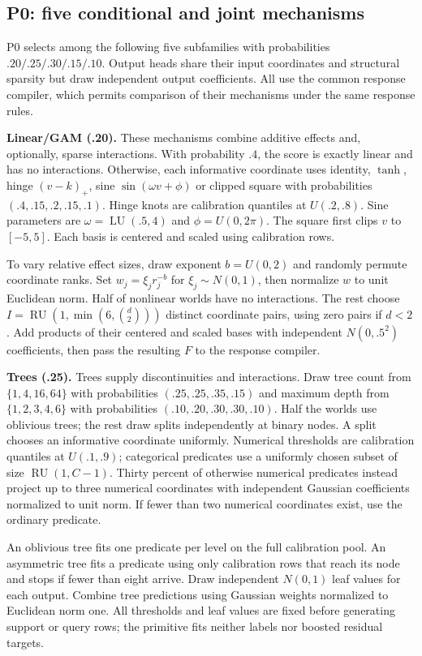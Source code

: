 \documentclass[11pt]{article}
\begin{document}
\subsection{P0: five conditional and joint mechanisms}

P0 selects among the following five subfamilies with probabilities $.20/.25/.30/.15/.10$. Output heads share their input coordinates and structural sparsity but draw independent output coefficients. All use the common response compiler, which permits comparison of their mechanisms under the same response rules.

\textbf{Linear/GAM (.20).} These mechanisms combine additive effects and, optionally, sparse interactions. With probability $.4$, the score is exactly linear and has no interactions. Otherwise, each informative coordinate uses identity, $\tanh$, hinge $(v-k)_+$, sine $\sin(\omega v+\phi)$ or clipped square with probabilities $(.4,.15,.2,.15,.1)$. Hinge knots are calibration quantiles at $U(.2,.8)$. Sine parameters are $\omega=\operatorname{LU}(.5,4)$ and $\phi=U(0,2\pi)$. The square first clips $v$ to $[-5,5]$. Each basis is centered and scaled using calibration rows.

To vary relative effect sizes, draw exponent $b=U(0,2)$ and randomly permute coordinate ranks. Set $w_j=\xi_j r_j^{-b}$ for $\xi_j\sim N(0,1)$, then normalize $w$ to unit Euclidean norm. Half of nonlinear worlds have no interactions. The rest choose $I=\operatorname{RU}(1,\min(6,{d\choose2}))$ distinct coordinate pairs, using zero pairs if $d<2$. Add products of their centered and scaled bases with independent $N(0,.5^2)$ coefficients, then pass the resulting $F$ to the response compiler.

\textbf{Trees (.25).} Trees supply discontinuities and interactions. Draw tree count from $\{1,4,16,64\}$ with probabilities $(.25,.25,.35,.15)$ and maximum depth from $\{1,2,3,4,6\}$ with probabilities $(.10,.20,.30,.30,.10)$. Half the worlds use oblivious trees; the rest draw splits independently at binary nodes. A split chooses an informative coordinate uniformly. Numerical thresholds are calibration quantiles at $U(.1,.9)$; categorical predicates use a uniformly chosen subset of size $\operatorname{RU}(1,C-1)$. Thirty percent of otherwise numerical predicates instead project up to three numerical coordinates with independent Gaussian coefficients normalized to unit norm. If fewer than two numerical coordinates exist, use the ordinary predicate.

An oblivious tree fits one predicate per level on the full calibration pool. An asymmetric tree fits a predicate using only calibration rows that reach its node and stops if fewer than eight arrive. Draw independent $N(0,1)$ leaf values for each output. Combine tree predictions using Gaussian weights normalized to Euclidean norm one. All thresholds and leaf values are fixed before generating support or query rows; the primitive fits neither labels nor boosted residual targets.
\end{document}
